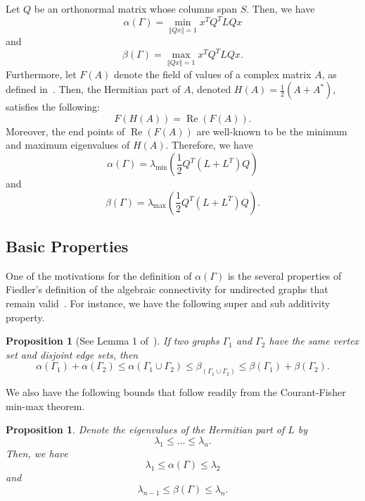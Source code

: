 \documentclass{article}
\newtheorem{proposition}[theorem]{Proposition}
\newcommand\norm[1]{\left\Vert#1\right\Vert}
\newcommand\re[1]{\operatorname{Re}\left(#1\right)}
\begin{document}
Let $Q$ be an orthonormal matrix whose columns span $S$.
Then, we have
\[
\alpha(\Gamma)=\min_{\norm{Qx}=1}x^{T}Q^{T}LQx
\]
and
\[
\beta(\Gamma)=\max_{\norm{Qx}=1}x^{T}Q^{T}LQx.
\]
Furthermore, let $F(A)$ denote the field of values of a complex matrix $A$, as defined in~\cite{Horn1991}.
Then, the Hermitian part of $A$, denoted $H(A)=\frac{1}{2}(A+A^{*})$, satisfies the following:
\[
F(H(A))=\re{F(A)}.
\]
Moreover, the end points of $\re{F(A)}$ are well-known to be the minimum and maximum eigenvalues of $H(A)$. 
Therefore, we have
\[
\alpha(\Gamma)=\lambda_{\text{min}}\left(\frac{1}{2}Q^{T}(L+L^{T})Q\right)
\]
and
\[
\beta(\Gamma)=\lambda_{\text{max}}\left(\frac{1}{2}Q^{T}(L+L^{T})Q\right).
\]

\subsection{Basic Properties}
One of the motivations for the definition of $\alpha(\Gamma)$ is the several properties of Fiedler's definition of the algebraic connectivity for undirected graphs that remain valid~\cite{Fiedler1973}.
For instance, we have the following super and sub additivity property.

\begin{proposition}[See Lemma 1 of~\cite{Wu2005-1}]
If two graphs $\Gamma_{1}$ and $\Gamma_{2}$ have the same vertex set and disjoint edge sets, then
\[
\alpha(\Gamma_{1})+\alpha(\Gamma_{2})\leq\alpha(\Gamma_{1}\cup\Gamma_{2})\leq\beta_(\Gamma_{1}\cup\Gamma_{2})\leq\beta(\Gamma_{1})+\beta(\Gamma_{2}).
\]
\end{proposition}

We also have the following bounds that follow readily from the Courant-Fisher min-max theorem.

\begin{proposition}
Denote the eigenvalues of the Hermitian part of $L$ by
\[
\lambda_{1}\leq\ldots\leq\lambda_{n}.
\]
Then, we have
\[
\lambda_{1}\leq\alpha(\Gamma)\leq\lambda_{2}
\]
and
\[
\lambda_{n-1}\leq\beta(\Gamma)\leq\lambda_{n}.
\]
\end{proposition}
\end{document}
